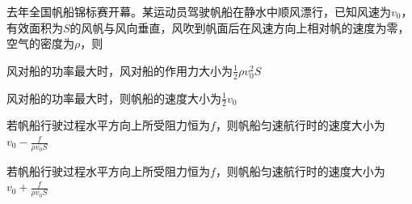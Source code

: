 去年全国帆船锦标赛开幕。某运动员驾驶帆船在静水中顺风漂行，已知风速为\(v_0\)，有效面积为\(S\)的风帆与风向垂直，风吹到帆面后在风速方向上相对帆的速度为零，空气的密度为\(\rho\)，则
\begin{choices}
	\item 风对船的功率最大时，风对船的作用力大小为\(\frac{1}{2} \rho v_0^2 S\)
	\item 风对船的功率最大时，则帆船的速度大小为\(\frac{1}{2} v_0\)
	\item 若帆船行驶过程水平方向上所受阻力恒为\(f\)，则帆船匀速航行时的速度大小为\(v_0 - \frac{f}{\rho v_0 S}\)
	\item 若帆船行驶过程水平方向上所受阻力恒为\(f\)，则帆船匀速航行时的速度大小为\(v_0 + \frac{f}{\rho v_0 S}\)
\end{choices}
\begin{answer}
    
\end{answer}